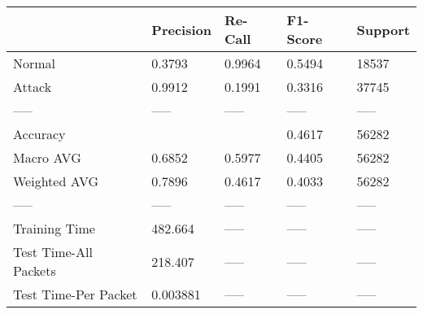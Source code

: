 \begin{tabular}{lllll}
\toprule
{} & Precision & Re-Call & F1-Score & Support \\
\midrule
Normal                &    0.3793 &  0.9964 &   0.5494 &   18537 \\
Attack                &    0.9912 &  0.1991 &   0.3316 &   37745 \\
-----                 &     ----- &   ----- &    ----- &   ----- \\
Accuracy              &           &         &   0.4617 &   56282 \\
Macro AVG             &    0.6852 &  0.5977 &   0.4405 &   56282 \\
Weighted AVG          &    0.7896 &  0.4617 &   0.4033 &   56282 \\
-----                 &     ----- &   ----- &    ----- &   ----- \\
Training Time         &   482.664 &   ----- &    ----- &   ----- \\
Test Time-All Packets &   218.407 &   ----- &    ----- &   ----- \\
Test Time-Per Packet  &  0.003881 &   ----- &    ----- &   ----- \\
\bottomrule
\end{tabular}
